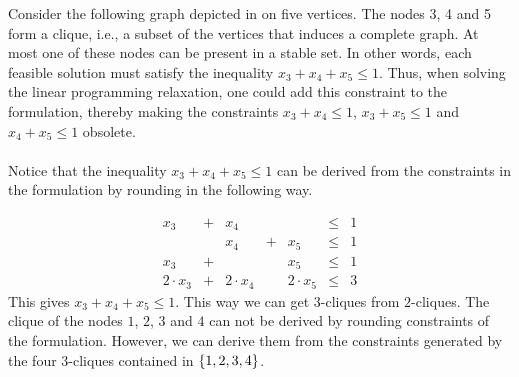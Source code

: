 \begin{example}
Consider the following graph depicted in  on five vertices. The nodes 3, 4 and 5 form a clique, i.e., a subset of the vertices that induces a complete graph. At most one of these nodes can be present in a stable set. In other words, each feasible solution must satisfy the inequality $x_3+x_4+x_5\leq 1$. Thus, when solving the linear programming relaxation, one could add this constraint to the formulation, thereby making the constraints $x_3+x_4\leq 1$, $x_3+x_5\leq 1$ and $x_4+x_5\leq 1$ obsolete.


\paragraph{}
Notice that the inequality $x_3+x_4+x_5\leq 1$ can be derived from the constraints in the formulation by rounding in the following way.

\begin{equation}
\begin{array}{rcrcrcc}
x_3&+&x_4&&&\leq&1\\
&&x_4&+&x_5&\leq&1\\
x_3&+&&&x_5&\leq&1\\\hline
2\cdot x_3&+&2\cdot x_4&&2\cdot x_5&\leq&3
\end{array}
\end{equation}
This gives $x_3+x_4+x_5\leq 1$. This way we can get $3$-cliques from $2$-cliques. The clique of the nodes $1$, $2$, $3$ and $4$ can not be derived by rounding constraints of the formulation. However, we can derive them from the constraints generated by the four $3$-cliques contained in $\left\{ 1,2,3,4 \right\}$.
\end{example}
